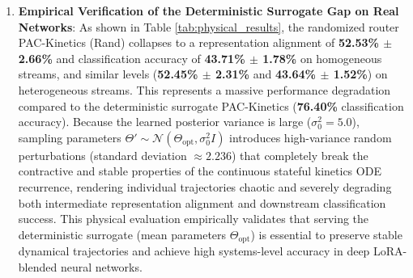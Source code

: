 \begin{enumerate}
    \item \textbf{Empirical Verification of the Deterministic Surrogate Gap on Real Networks}: As shown in Table \ref{tab:physical_results}, the randomized router \textsf{PAC-Kinetics (Rand)} collapses to a representation alignment of \textbf{52.53\% $\pm$ 2.66\%} and classification accuracy of \textbf{43.71\% $\pm$ 1.78\%} on homogeneous streams, and similar levels (\textbf{52.45\% $\pm$ 2.31\%} and \textbf{43.64\% $\pm$ 1.52\%}) on heterogeneous streams. This represents a massive performance degradation compared to the deterministic surrogate \textsf{PAC-Kinetics} (\textbf{76.40\%} classification accuracy). Because the learned posterior variance is large ($\sigma_0^2 = 5.0$), sampling parameters $\Theta' \sim \mathcal{N}(\Theta_{\text{opt}}, \sigma_0^2 I)$ introduces high-variance random perturbations (standard deviation $\approx 2.236$) that completely break the contractive and stable properties of the continuous stateful kinetics ODE recurrence, rendering individual trajectories chaotic and severely degrading both intermediate representation alignment and downstream classification success. This physical evaluation empirically validates that serving the deterministic surrogate (mean parameters $\Theta_{\text{opt}}$) is essential to preserve stable dynamical trajectories and achieve high systems-level accuracy in deep LoRA-blended neural networks.


\end{enumerate}
